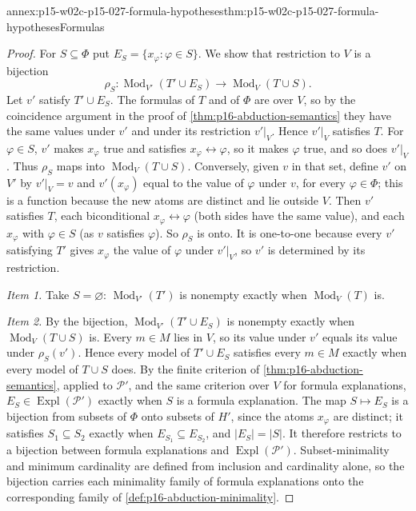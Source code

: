 \begin{annexitem}{annex:p15-w02c-p15-027-formula-hypotheses}{thm:p15-w02c-p15-027-formula-hypotheses}{Formulas}
\begin{proof}
For \(S\subseteq\Phi\) put \(E_S=\{x_\varphi:\varphi\in S\}\). We show
that restriction to \(V\) is a bijection
\[
 \rho_S:\operatorname{Mod}_{V'}(T'\cup E_S)\longrightarrow
        \operatorname{Mod}_V(T\cup S).
\]
Let \(v'\) satisfy \(T'\cup E_S\). The formulas of \(T\) and of
\(\Phi\) are over \(V\), so by the coincidence argument in the proof of
\cref{thm:p16-abduction-semantics} they have the same values under
\(v'\) and under its restriction \(v'|_V\). Hence \(v'|_V\) satisfies
\(T\). For \(\varphi\in S\), \(v'\) makes \(x_\varphi\) true and
satisfies \(x_\varphi\leftrightarrow\varphi\), so it makes \(\varphi\)
true, and so does \(v'|_V\). Thus \(\rho_S\) maps into
\(\operatorname{Mod}_V(T\cup S)\). Conversely, given \(v\) in that set,
define \(v'\) on \(V'\) by \(v'|_V=v\) and \(v'(x_\varphi)\) equal to
the value of \(\varphi\) under \(v\), for every \(\varphi\in\Phi\); this
is a function because the new atoms are distinct and lie outside \(V\).
Then \(v'\) satisfies \(T\), each biconditional
\(x_\varphi\leftrightarrow\varphi\) (both sides have the same value), and
each \(x_\varphi\) with \(\varphi\in S\) (as \(v\) satisfies
\(\varphi\)). So \(\rho_S\) is onto. It is one-to-one because every
\(v'\) satisfying \(T'\) gives \(x_\varphi\) the value of \(\varphi\)
under \(v'|_V\), so \(v'\) is determined by its restriction.

\emph{Item 1.} Take \(S=\varnothing\): \(\operatorname{Mod}_{V'}(T')\) is
nonempty exactly when \(\operatorname{Mod}_V(T)\) is.

\emph{Item 2.} By the bijection, \(\operatorname{Mod}_{V'}(T'\cup E_S)\)
is nonempty exactly when \(\operatorname{Mod}_V(T\cup S)\) is. Every
\(m\in M\) lies in \(V\), so its value under \(v'\) equals its value
under \(\rho_S(v')\). Hence every model of \(T'\cup E_S\) satisfies
every \(m\in M\) exactly when every model of \(T\cup S\) does. By the
finite criterion of \cref{thm:p16-abduction-semantics}, applied to
\(\mathcal P'\), and the same criterion over \(V\) for formula
explanations, \(E_S\in\operatorname{Expl}(\mathcal P')\) exactly when
\(S\) is a formula explanation. The map \(S\mapsto E_S\) is a bijection
from subsets of \(\Phi\) onto subsets of \(H'\), since the atoms
\(x_\varphi\) are distinct; it satisfies \(S_1\subseteq S_2\) exactly
when \(E_{S_1}\subseteq E_{S_2}\), and \(|E_S|=|S|\). It therefore
restricts to a bijection between formula explanations and
\(\operatorname{Expl}(\mathcal P')\). Subset-minimality and minimum
cardinality are defined from inclusion and cardinality alone, so the
bijection carries each minimality family of formula explanations onto
the corresponding family of \cref{def:p16-abduction-minimality}.
\end{proof}
\end{annexitem}

